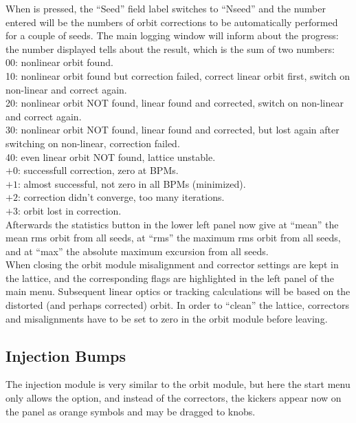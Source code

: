 \documentclass[12pt]{article}
\newcommand\todo[1]{$\Longrightarrow$ {\em #1} }
\newcommand\button[1]{\fbox{\small\bf #1}}
\newcommand\chkbox[1]{\fbox{\small $\circ\,$#1}}
\begin{document}
When \button{Loop} is pressed, the ``Seed'' field label switches to ``Nseed'' and the number entered will be the numbers of orbit corrections to be automatically performed for a couple of seeds.
The main logging window will inform about the progress: the number displayed tells about the result, which is the sum of two numbers:\\
00: nonlinear orbit found.\\
10: nonlinear orbit found but correction failed, correct linear orbit first, switch on non-linear and correct again.\\
20: nonlinear orbit NOT found, linear found and corrected, switch on non-linear and correct again.\\
30: nonlinear orbit NOT found, linear found and corrected, but lost again after switching on non-linear, correction failed.\\
40: even linear orbit NOT found, lattice unstable.\\
$+0$: successfull correction, zero at BPMs.\\
$+1$: almost successful, not zero in all BPMs (minimized).\\
$+2$: correction didn't converge, too many iterations.\\
$+3$: orbit lost in correction.\\
Afterwards %
the statistics button in the lower left panel now give at ``mean'' the mean rms orbit from all seeds, at ``rms'' the maximum rms orbit from all seeds, and at ``max'' the absolute maximum excursion from all seeds.\\

When closing the orbit module misalignment and corrector settings are kept in the lattice, and the corresponding flags are highlighted in the left panel of the main menu. Subsequent linear optics or tracking calculations will be based on the distorted (and perhaps corrected) orbit. In order to ``clean'' the lattice, correctors and misalignments have to be set to zero in the orbit module before leaving.


\subsection{Injection Bumps}

The injection module is very similar to the orbit module, but here the start menu only allows the \chkbox{single pass} option, and instead of the correctors, the kickers appear now on the panel as orange symbols and may be dragged to knobs.
\end{document}
